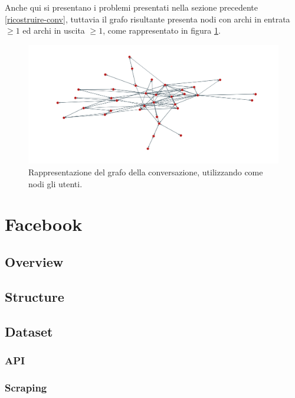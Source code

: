 Anche qui si presentano i problemi presentati nella sezione precedente \ref{ricostruire-conv}, tuttavia il grafo risultante presenta nodi con archi in entrata $\geq 1$ ed archi in uscita $\geq 1$, come rappresentato in figura \ref{fig:users-twitter}.

\begin{figure}[ht]
    \includegraphics[width=\linewidth]{Immagini/twitter-users.png}
    \caption{Rappresentazione del grafo della conversazione, utilizzando come nodi gli utenti.}
    \label{fig:users-twitter}
\end{figure}





\section {Facebook} %

\subsection {Overview}

\subsection {Structure}

\subsection {Dataset}
\subsubsection {API}
\subsubsection {Scraping}
